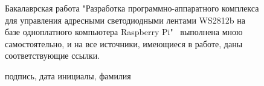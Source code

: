 \newpage 

\begin{figure}

Бакалаврская работа "Разработка программно-аппаратного комплекса для управления адресными светодиодными лентами WS2812b на базе одноплатного компьютера Raspberry Pi" \ выполнена мною самостоятельно, и на все источники, имеющиеся в работе, даны соответствующие ссылки.

\end{figure}

\begin{figure}
\begin{flushright}
\underline{\hspace{4cm}}  \quad  \underline{\hspace{4cm}} 

 \scriptsize подпись, дата     \quad     \qquad  \qquad  \qquad        \scriptsize инициалы, фамилия  \qquad  \qquad  \qquad 
\end{flushright}
\end{figure}